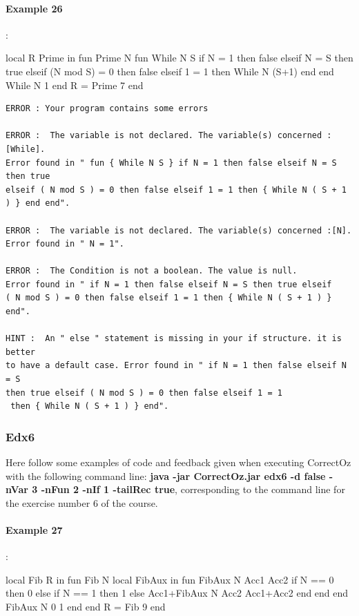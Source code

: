 \documentclass[11pt,a4paper,twoside,openright]{report}
\begin{document}
\paragraph{Example 26}:

\begin{OZ}
local R Prime in
	fun {Prime N}
		fun {While N S}
		    if N = 1 then false
		    elseif N = S then true
		    elseif (N mod S) = 0 then false
		    elseif 1 = 1 then {While N (S+1)}
		    end
	end
	{While N 1}
end
R = {Prime 7}
end
\end{OZ}

\begin{lstlisting}
ERROR : Your program contains some errors

ERROR :  The variable is not declared. The variable(s) concerned :[While]. 
Error found in " fun { While N S } if N = 1 then false elseif N = S then true 
elseif ( N mod S ) = 0 then false elseif 1 = 1 then { While N ( S + 1 ) } end end".

ERROR :  The variable is not declared. The variable(s) concerned :[N]. 
Error found in " N = 1".

ERROR :  The Condition is not a boolean. The value is null.  
Error found in " if N = 1 then false elseif N = S then true elseif 
( N mod S ) = 0 then false elseif 1 = 1 then { While N ( S + 1 ) } end".

HINT :  An " else " statement is missing in your if structure. it is better 
to have a default case. Error found in " if N = 1 then false elseif N = S 
then true elseif ( N mod S ) = 0 then false elseif 1 = 1
 then { While N ( S + 1 ) } end".

\end{lstlisting}
\subsubsection{Edx6}
Here follow some examples of code and feedback given when executing 
CorrectOz with the following command line: \textbf{java -jar CorrectOz.jar edx6 -d 
false -nVar 3 -nFun 2 -nIf 1 -tailRec true}, corresponding to the command line 
for the exercise number 6 of the course.

\paragraph{Example 27}:

\begin{OZ}
local Fib R in
    fun {Fib N}
        local FibAux in
            fun {FibAux N Acc1 Acc2}
                if N == 0 then 0
					else if N == 1 then 1
						else Acc1+{FibAux N Acc2 Acc1+Acc2}
						end
            	end
            end
            {FibAux N 0 1}
    	end
    end
    R = {Fib 9}
end
\end{OZ}
\end{document}
